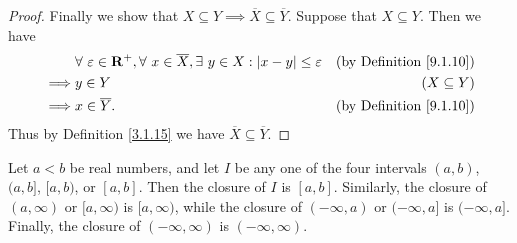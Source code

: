 \begin{proof}
    Finally we show that \(X \subseteq Y \implies \overline{X} \subseteq \overline{Y}\).
    Suppose that \(X \subseteq Y\).
    Then we have
    \begin{align*}
                 & \forall\ \varepsilon \in \mathbf{R}^+, \forall\ x \in \overline{X}, \exists\ y \in X : \abs*{x - y} \leq \varepsilon & \text{(by Definition \ref{9.1.10})} \\
        \implies & y \in Y                                                                                                              & (X \subseteq Y)                     \\
        \implies & x \in \overline{Y}.                                                                                                  & \text{(by Definition \ref{9.1.10})}
    \end{align*}
    Thus by Definition \ref{3.1.15} we have \(\overline{X} \subseteq \overline{Y}\).
\end{proof}

\begin{lemma}\label{9.1.12}
    Let \(a < b\) be real numbers, and let \(I\) be any one of the four intervals \((a, b)\), \((a, b]\), \([a, b)\), or \([a, b]\).
    Then the closure of \(I\) is \([a, b]\).
    Similarly, the closure of \((a, \infty)\) or \([a, \infty)\) is \([a, \infty)\), while the closure of \((-\infty, a)\) or \((-\infty, a]\) is \((-\infty, a]\).
    Finally, the closure of \((-\infty, \infty)\) is \((-\infty, \infty)\).
\end{lemma}

